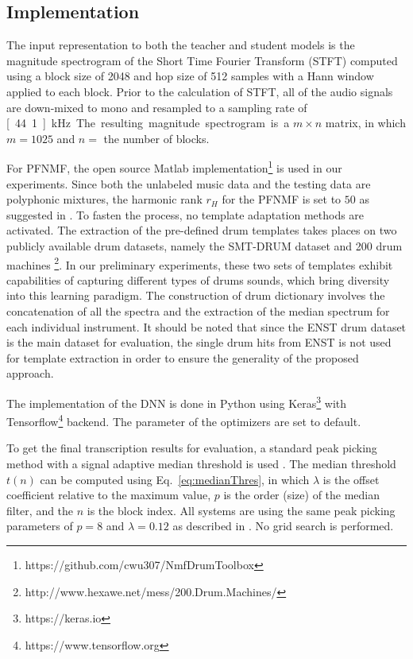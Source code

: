 \documentclass{article}
\begin{document}
\subsection{Implementation}
The input representation to both the teacher and student models is the magnitude spectrogram of the Short Time Fourier Transform (STFT) computed using a block size of 2048 and hop size of 512 samples with a Hann window applied to each block. Prior to the calculation of STFT, all of the audio signals are down-mixed to mono and resampled to a sampling rate of \unit[44.1]{kHz}. The resulting magnitude spectrogram is a $m \times n$ matrix, in which $m = 1025$ and $n = $ the number of blocks. 

For PFNMF, the open source Matlab implementation\footnote{https://github.com/cwu307/NmfDrumToolbox} is used in our experiments. Since both the unlabeled music data and the testing data are polyphonic mixtures, the harmonic rank $r_{H} $ for the PFNMF is set to $50$ as suggested in \cite{Wu2015a}. To fasten the process, no template adaptation methods are activated. The extraction of the pre-defined drum templates takes places on two publicly available drum datasets, namely the SMT-DRUM dataset \cite{Dittmar2014} and 200 drum machines \footnote{http://www.hexawe.net/mess/200.Drum.Machines/}. In our preliminary experiments, these two sets of templates exhibit capabilities of capturing different types of drums sounds, which bring diversity into this learning paradigm. The construction of drum dictionary involves the concatenation of all the spectra and the extraction of the median spectrum for each individual instrument. It should be noted that since the ENST drum dataset is the main dataset for evaluation, the single drum hits from ENST is not used for template extraction in order to ensure the generality of the proposed approach.

The implementation of the DNN is done in Python using Keras\footnote{https://keras.io} with Tensorflow\footnote{https://www.tensorflow.org} backend. The parameter of the optimizers are set to default. 

To get the final transcription results for evaluation, a standard peak picking method with a signal adaptive median threshold is used \cite{Lerch2012}. The median threshold $t(n)$ can be computed using Eq.~\ref{eq:medianThres}, in which $\lambda$ is the offset coefficient relative to the maximum value, $p$ is the order (size) of the median filter, and the $n$ is the block index. All systems are using the same peak picking parameters of $p = 8$ and $\lambda = 0.12$ as described in \cite{Wu2015a}. No grid search is performed.  
\end{document}
